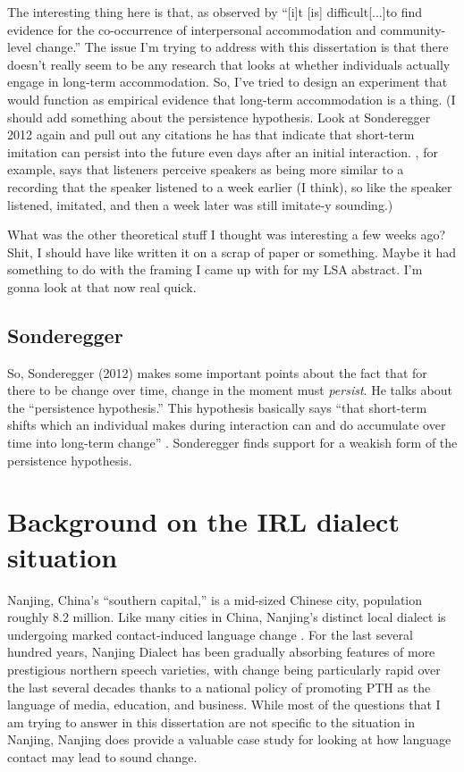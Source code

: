 The interesting thing here is that, as observed by \citet{auer2005role} ``[i]t [is] difficult[...]to find evidence for the co-occurrence of interpersonal accommodation and community-level change.'' The issue I'm trying to address with this dissertation is that there doesn't really seem to be any research that looks at whether individuals actually engage in long-term accommodation. So, I've tried to design an experiment that would function as empirical evidence that long-term accommodation is a thing. (I should add something about the persistence hypothesis. Look at Sonderegger 2012 again and pull out any citations he has that indicate that short-term imitation can persist into the future even days after an initial interaction. \cite{goldinger2000role}, for example, says that listeners perceive speakers as being more similar to a recording that the speaker listened to a week earlier (I think), so like the speaker listened, imitated, and then a week later was still imitate-y sounding.) 

What was the other theoretical stuff I thought was interesting a few weeks ago? Shit, I should have like written it on a scrap of paper or something. Maybe it had something to do with the framing I came up with for my LSA abstract. I'm gonna look at that now real quick.

\subsection{Sonderegger}
So, Sonderegger (2012) makes some important points about the fact that for there to be change over time, change in the moment must \textit{persist}. He talks about the ``persistence hypothesis.'' This hypothesis basically says ``that short-term shifts which an individual makes during interaction can and do accumulate over time into long-term change'' \citep[p.102]{sonderegger2012phonetic}. Sonderegger finds support for a weakish form of the persistence hypothesis.

\section{Background on the IRL dialect situation}
Nanjing, China’s ``southern capital,'' is a mid-sized Chinese city, population roughly 8.2 million. Like many cities in China, Nanjing’s distinct local dialect is undergoing marked contact-induced language change \citep{bao1980sixty}. For the last several hundred years, Nanjing Dialect has been gradually absorbing features of more prestigious northern speech varieties, with change being particularly rapid over the last several decades thanks to a national policy of promoting PTH as the language of media, education, and business. While most of the questions that I am trying to answer in this dissertation are not specific to the situation in Nanjing, Nanjing does provide a valuable case study for looking at how language contact may lead to sound change.

